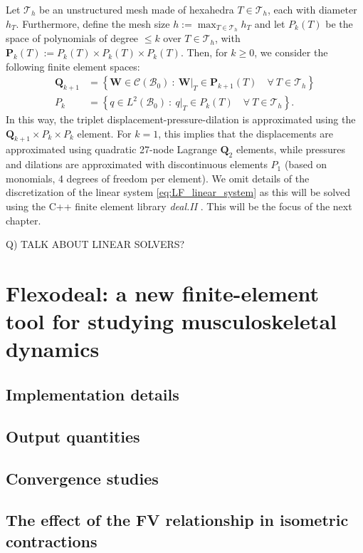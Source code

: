 \documentclass{sfuthesis}
\numberwithin{equation}{section}
\numberwithin{figure}{chapter}
\numberwithin{table}{chapter}
\theoremstyle{definition}
\def\*#1{{\mathbf{#1}}} %
\newcommand{\B}{\mathcal{B}}
\begin{document}
Let $\mathcal{T}_h$ be an unstructured mesh made of hexahedra $T \in \mathcal{T}_h$, each with diameter $h_T$. Furthermore, define the mesh size $h := \max_{T \in \mathcal{T}_h} h_T$ and let $P_k(T)$ be the space of polynomials of degree $\leq k$ over $T \in \mathcal{T}_h$, with $\*P_k(T) := P_k(T) \times P_k(T) \times P_k(T)$. Then, for $k \geq 0$, we consider the following finite element spaces:
\begin{align}
    \*Q_{k+1} &= \left\{ \*W \in \mathcal{C}(\B_0) \ : \ \*W \Big|_T \in \*P_{k+1}(T) \quad \forall \ T \in \mathcal{T}_h \right\} \\
    P_k &= \left\{ q \in L^2(\B_0) \ : \ q \Big|_T \in P_k(T) \quad \forall \ T \in \mathcal{T}_h \right\}.
\end{align}
In this way, the triplet displacement-pressure-dilation is approximated using the $\*Q_{k+1} \times P_k \times P_k$ element. For $k=1$, this implies that the displacements are approximated using quadratic 27-node Lagrange $\*Q_2$ elements, while pressures and dilations are approximated with discontinuous elements $P_1$ (based on monomials, 4 degrees of freedom per element). We omit details of the discretization of the linear system \eqref{eq:LF_linear_system} as this will be solved using the C++ finite element library \textit{deal.II} \cite{dealii}. This will be the focus of the next chapter.

{\color{blue} Q) TALK ABOUT LINEAR SOLVERS?}

\chapter{Flexodeal: a new finite-element tool for studying musculoskeletal dynamics}

\section{Implementation details}

\section{Output quantities}

\section{Convergence studies}

\section{The effect of the FV relationship in isometric contractions}
\end{document}
